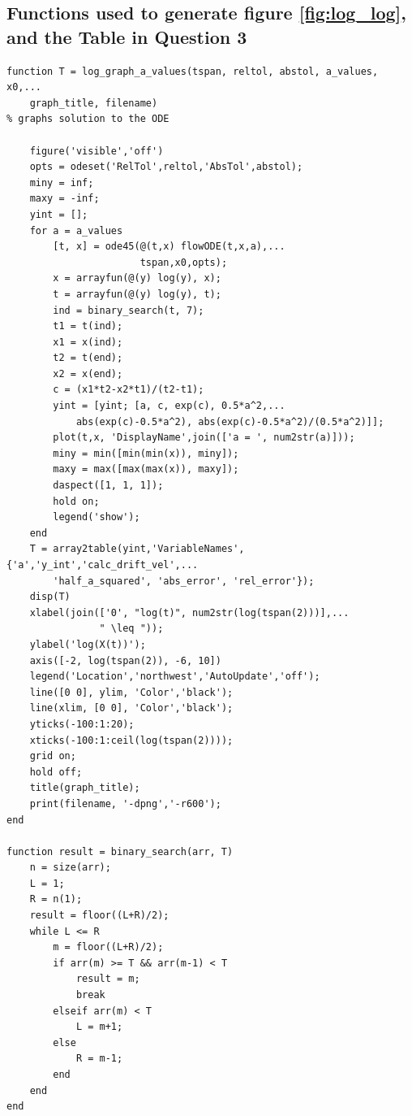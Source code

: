 \documentclass[11pt]{article} %
\begin{document}
\subsection*{Functions used to generate figure \ref{fig:log_log}, and the Table in Question 3}
\begin{lstlisting}
function T = log_graph_a_values(tspan, reltol, abstol, a_values, x0,...
    graph_title, filename)
% graphs solution to the ODE

    figure('visible','off')
    opts = odeset('RelTol',reltol,'AbsTol',abstol);
    miny = inf;
    maxy = -inf;
    yint = [];
    for a = a_values
        [t, x] = ode45(@(t,x) flowODE(t,x,a),...
                       tspan,x0,opts);
        x = arrayfun(@(y) log(y), x);
        t = arrayfun(@(y) log(y), t);
        ind = binary_search(t, 7);
        t1 = t(ind);
        x1 = x(ind);
        t2 = t(end);
        x2 = x(end);
        c = (x1*t2-x2*t1)/(t2-t1);
        yint = [yint; [a, c, exp(c), 0.5*a^2,...
            abs(exp(c)-0.5*a^2), abs(exp(c)-0.5*a^2)/(0.5*a^2)]];
        plot(t,x, 'DisplayName',join(['a = ', num2str(a)]));
        miny = min([min(min(x)), miny]);
        maxy = max([max(max(x)), maxy]);
        daspect([1, 1, 1]);
        hold on;
        legend('show');
    end
    T = array2table(yint,'VariableNames',{'a','y_int','calc_drift_vel',...
        'half_a_squared', 'abs_error', 'rel_error'});
    disp(T)
    xlabel(join(['0', "log(t)", num2str(log(tspan(2)))],...
                " \leq "));
    ylabel('log(X(t))');
    axis([-2, log(tspan(2)), -6, 10])
    legend('Location','northwest','AutoUpdate','off');
    line([0 0], ylim, 'Color','black');
    line(xlim, [0 0], 'Color','black');
    yticks(-100:1:20);
    xticks(-100:1:ceil(log(tspan(2))));
    grid on;
    hold off;
    title(graph_title);
    print(filename, '-dpng','-r600');
end

function result = binary_search(arr, T)
    n = size(arr);
    L = 1;
    R = n(1);
    result = floor((L+R)/2);
    while L <= R
        m = floor((L+R)/2);
        if arr(m) >= T && arr(m-1) < T
            result = m;
            break
        elseif arr(m) < T
            L = m+1;
        else
            R = m-1;
        end
    end
end
\end{lstlisting}
\end{document}
